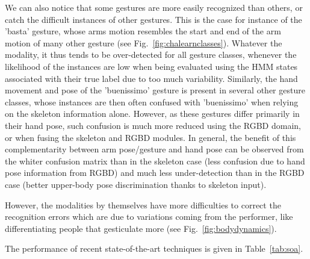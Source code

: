We can also notice that some gestures are more easily recognized than others,
or catch the difficult instances of other gestures.
This is the case for instance of the 'basta' gesture,
whose arms motion  resembles the  start and end of the arm motion of many other gesture (see Fig.~\ref{fig:chalearnclasses}).
Whatever the modality, it thus tends to be over-detected for all gesture classes, whenever the
likelihood of the instances are low when being evaluated using the HMM states associated with their true label
due to too much variability.
%
Similarly, the hand movement and pose of the 'buenissimo' gesture is present in several other gesture classes,
whose instances are then often confused with 'buenissimo' when relying on the skeleton information alone.
%
However, as these gestures differ primarily in their hand pose, such confusion is much more reduced using the RGBD domain,
or when fusing  the skeleton and RGBD modules.
%
In general, the benefit of this complementarity between arm pose/gesture and hand pose
can be observed from the whiter confusion matrix than in the skeleton case (less confusion due to hand pose information from RGBD)
and much less under-detection than in the RGBD case (better upper-body pose discrimination thanks to skeleton input).
%

However, the modalities by themselves have more difficulties to correct the recognition errors which are due to variations coming from the performer,
like differentiating  people that gesticulate more (see Fig.~\ref{fig:bodydynamics}).


%



%
The performance of recent state-of-the-art techniques is given in Table~\ref{tab:soa}.




